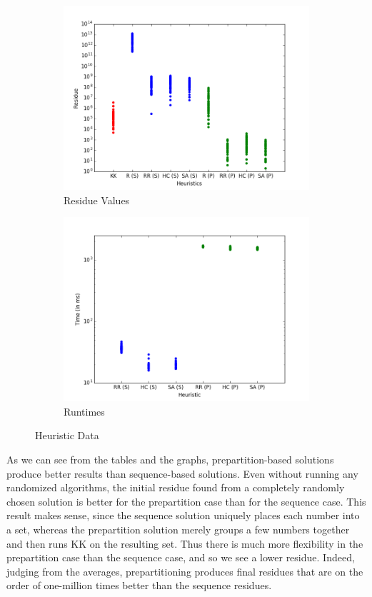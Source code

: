 \documentclass[12pt]{article}
\begin{document}
\begin{figure}[h]
\begin{subfigure}[t]{0.5\textwidth}
\includegraphics[width=\textwidth]{img/residues.png}
\caption{Residue Values}
\end{subfigure}
\begin{subfigure}[t]{0.5\textwidth}
\includegraphics[width=\textwidth]{img/times.png}
\caption{Runtimes}
\end{subfigure}
\caption{Heuristic Data}
\end{figure}

As we can see from the tables and the graphs, prepartition-based solutions produce better results than sequence-based solutions. Even without running any randomized algorithms, the initial residue found from a completely randomly chosen solution is better for the prepartition case than for the sequence case. This result makes sense, since the sequence solution uniquely places each number into a set, whereas the prepartition solution merely groups a few numbers together and then runs KK on the resulting set. Thus there is much more flexibility in the prepartition case than the sequence case, and so we see a lower residue. Indeed, judging from the averages, prepartitioning produces final residues that are on the order of one-million times better than the sequence residues. \\
\end{document}
